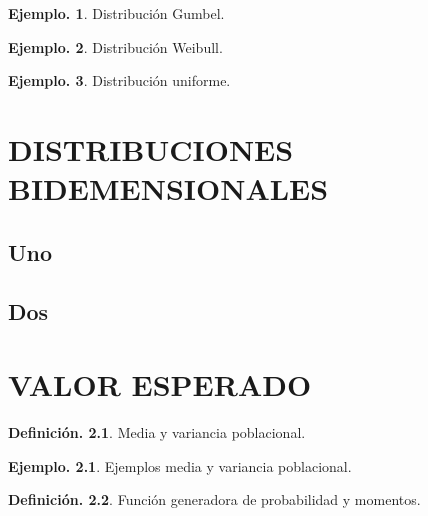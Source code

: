 \documentclass[]{book}
\theoremstyle{definition}
\newtheorem{definition}{Definición.}[chapter]
\theoremstyle{definition}
\newtheorem{example}{Ejemplo.}[chapter]
\theoremstyle{definition}
\theoremstyle{remark}
\begin{document}
\begin{example}
\protect\hypertarget{exm:unnamed-chunk-152}{}{\label{exm:unnamed-chunk-152} }
Distribución Gumbel.
\end{example}

\begin{example}
\protect\hypertarget{exm:unnamed-chunk-153}{}{\label{exm:unnamed-chunk-153} }Distribución Weibull.
\end{example}

\begin{example}
\protect\hypertarget{exm:unnamed-chunk-154}{}{\label{exm:unnamed-chunk-154} }Distribución uniforme.
\end{example}

\hypertarget{varbi}{%
\chapter{DISTRIBUCIONES BIDEMENSIONALES}\label{varbi}}

\hypertarget{uno}{%
\section{Uno}\label{uno}}

\hypertarget{dos}{%
\section{Dos}\label{dos}}

\hypertarget{expected}{%
\chapter{VALOR ESPERADO}\label{expected}}

\begin{definition}
\protect\hypertarget{def:unnamed-chunk-155}{}{\label{def:unnamed-chunk-155} }Media y variancia poblacional.
\end{definition}

\begin{example}
\protect\hypertarget{exm:unnamed-chunk-156}{}{\label{exm:unnamed-chunk-156} }Ejemplos media y variancia poblacional.
\end{example}

\begin{definition}
\protect\hypertarget{def:unnamed-chunk-157}{}{\label{def:unnamed-chunk-157} }Función generadora de probabilidad y momentos.
\end{definition}
\end{document}
